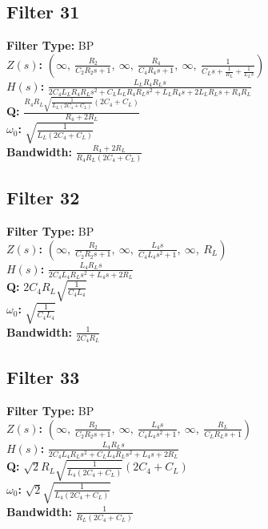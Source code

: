 \documentclass{article}
\begin{document}
\subsection*{Filter 31}
\textbf{Filter Type:} BP \\ 
\textbf{$Z(s)$:} $\left( \infty, \  \frac{R_{2}}{C_{2} R_{2} s + 1}, \  \infty, \  \frac{R_{4}}{C_{4} R_{4} s + 1}, \  \infty, \  \frac{1}{C_{L} s + \frac{1}{R_{L}} + \frac{1}{L_{L} s}}\right)$ \\ 
\textbf{$H(s)$:} $\frac{L_{L} R_{4} R_{L} s}{2 C_{4} L_{L} R_{4} R_{L} s^{2} + C_{L} L_{L} R_{4} R_{L} s^{2} + L_{L} R_{4} s + 2 L_{L} R_{L} s + R_{4} R_{L}}$ \\ 
\textbf{Q:} $\frac{R_{4} R_{L} \sqrt{\frac{1}{L_{L} \left(2 C_{4} + C_{L}\right)}} \left(2 C_{4} + C_{L}\right)}{R_{4} + 2 R_{L}}$ \\ 
\textbf{$\omega_0$:} $\sqrt{\frac{1}{L_{L} \left(2 C_{4} + C_{L}\right)}}$ \\ 
\textbf{Bandwidth:} $\frac{R_{4} + 2 R_{L}}{R_{4} R_{L} \left(2 C_{4} + C_{L}\right)}$ \\ 
\subsection*{Filter 32}
\textbf{Filter Type:} BP \\ 
\textbf{$Z(s)$:} $\left( \infty, \  \frac{R_{2}}{C_{2} R_{2} s + 1}, \  \infty, \  \frac{L_{4} s}{C_{4} L_{4} s^{2} + 1}, \  \infty, \  R_{L}\right)$ \\ 
\textbf{$H(s)$:} $\frac{L_{4} R_{L} s}{2 C_{4} L_{4} R_{L} s^{2} + L_{4} s + 2 R_{L}}$ \\ 
\textbf{Q:} $2 C_{4} R_{L} \sqrt{\frac{1}{C_{4} L_{4}}}$ \\ 
\textbf{$\omega_0$:} $\sqrt{\frac{1}{C_{4} L_{4}}}$ \\ 
\textbf{Bandwidth:} $\frac{1}{2 C_{4} R_{L}}$ \\ 
\subsection*{Filter 33}
\textbf{Filter Type:} BP \\ 
\textbf{$Z(s)$:} $\left( \infty, \  \frac{R_{2}}{C_{2} R_{2} s + 1}, \  \infty, \  \frac{L_{4} s}{C_{4} L_{4} s^{2} + 1}, \  \infty, \  \frac{R_{L}}{C_{L} R_{L} s + 1}\right)$ \\ 
\textbf{$H(s)$:} $\frac{L_{4} R_{L} s}{2 C_{4} L_{4} R_{L} s^{2} + C_{L} L_{4} R_{L} s^{2} + L_{4} s + 2 R_{L}}$ \\ 
\textbf{Q:} $\sqrt{2} R_{L} \sqrt{\frac{1}{L_{4} \left(2 C_{4} + C_{L}\right)}} \left(2 C_{4} + C_{L}\right)$ \\ 
\textbf{$\omega_0$:} $\sqrt{2} \sqrt{\frac{1}{L_{4} \left(2 C_{4} + C_{L}\right)}}$ \\ 
\textbf{Bandwidth:} $\frac{1}{R_{L} \left(2 C_{4} + C_{L}\right)}$ \\ 
\end{document}
